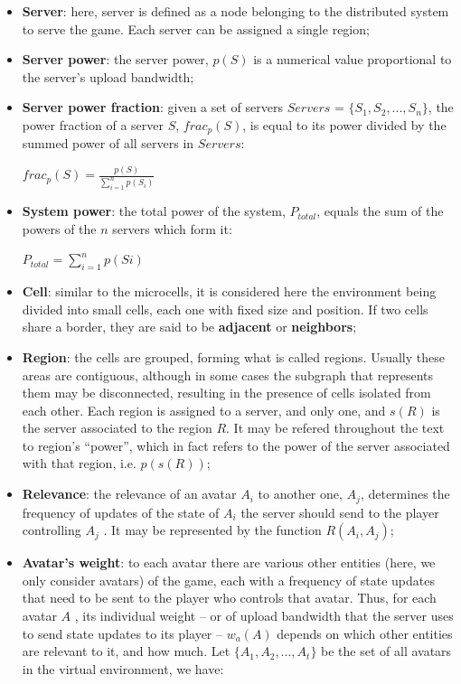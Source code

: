 \begin{itemize}
	\item \textbf{Server}: here, server is defined as a node belonging to the distributed system to serve the game. Each server can be assigned a single region;
	\item \textbf{Server power}: the server power, $p(S)$ is a numerical value proportional to the server's upload bandwidth;
	\item \textbf{Server power fraction}: given a set of servers $Servers$ = $\{S_1, S_2, ..., S_n\}$, the power fraction of a server $S$, $frac_p(S)$, is equal to its power divided by the summed power of all servers in $Servers$:
	
		\begin{center}
			$frac_p(S) = \frac{\displaystyle p(S)}{\displaystyle\sum_{i=1}^{n} p(S_i)}$
		\end{center}
		
	\item \textbf{System power}: the total power of the system, $P_{total}$, equals the sum of the powers of the $n$ servers which form it:
	
		\begin{center}
			$\displaystyle P_{total} = \sum_{i=1}^{n} p(Si)$
		\end{center}
	
	\item \textbf{Cell}: similar to the microcells, it is considered here the environment being divided into small cells, each one with fixed size and position. If two cells share a border, they are said to be \textbf{adjacent} or \textbf{neighbors};
	\item \textbf{Region}: the cells are grouped, forming what is called regions. Usually these areas are contiguous, although in some cases the subgraph that represents them may be disconnected, resulting in the presence of cells isolated from each other. Each region is assigned to a server, and only one, and $s(R)$ is the server associated to the region $R$. It may be refered throughout the text to region's ``power'', which in fact refers to the power of the server associated with that region, i.e. $p(s(R))$;
	\item \textbf{Relevance}: the relevance of an avatar $A_i$ to another one, $A_j$, determines the frequency of updates of the state of $A_i$ the server should send to the player controlling $A_j$ \cite{bezerra2008a3}. It may be represented by the function $R(A_i,A_j)$;
	\item \textbf{Avatar's weight}: to each avatar there are various other entities (here, we only consider avatars) of the game, each with a frequency of state updates that need to be sent to the player who controls that avatar. Thus, for each avatar $A$ , its individual weight -- or of upload bandwidth that the server uses to send state updates to its player -- $w_a(A)$ depends on which other entities are relevant to it, and how much. 
	Let $\{A_1, A_2, ..., A_t\}$ be the set of all avatars in the virtual environment, we have:
	

\end{itemize}
